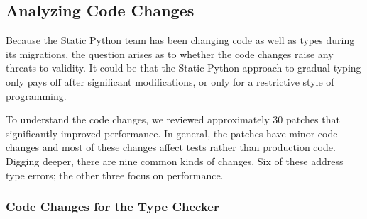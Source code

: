 \documentclass[english,cleveref,submission]{programming}
\newcommand{\SP}{Static Python}
\begin{document}
\subsection{Analyzing Code Changes}

Because the \SP{} team has been changing code as well as types
during its migrations, the question arises as to whether the code changes
raise any threats to validity.
It could be that the \SP{} approach to gradual typing only pays off
after significant modifications, or only for a restrictive style of programming.

To understand the code changes, we reviewed approximately 30 patches that
significantly improved performance.
In general, the patches have minor code changes and most of these changes
affect tests rather than production code.
Digging deeper, there are nine common kinds of changes.
Six of these address type errors; the other three focus on performance.


\subsubsection{Code Changes for the Type Checker}

\end{document}

